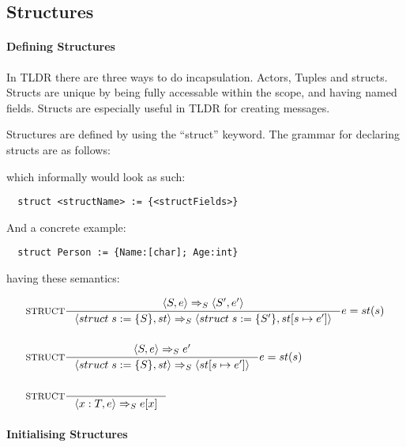 \subsection{Structures}
\label{subsec:structs}

\paragraph{Defining Structures}
\label{sec:defStructures}

In TLDR there are three ways to do incapsulation. Actors, Tuples and structs. Structs are unique by being fully accessable within the scope, and having named fields. Structs are especially useful in TLDR for creating messages.

Structures are defined by using the \enquote{struct} keyword. The grammar for declaring structs are as follows:


which informally would look as such:

\begin{verbatim}
  struct <structName> := {<structFields>}
\end{verbatim}

And a concrete example:

\begin{verbatim}
  struct Person := {Name:[char]; Age:int}
\end{verbatim}

having these semantics:

\begin{align*}
&\inference[$\text{STRUCT}$]{\Braket{S, e} \Rightarrow_S \Braket{S', e'}}
                            {\Braket{struct\;s := \{S\}, st} \Rightarrow_S \Braket{struct\;s := \{S'\}, st[s \mapsto e']}}
                            {e=st(s)}
\\\\
&\inference[$\text{STRUCT}$]{\Braket{S, e} \Rightarrow_S e'}
                            {\Braket{struct\;s := \{S\}, st} \Rightarrow_S \Braket{st[s \mapsto e']}}
                            {e=st(s)}
\\\\
&\inference[$\text{STRUCT}$]{}
                            {\Braket{x:T, e} \Rightarrow_S e[x]}
\end{align*}

\paragraph{Initialising Structures}
\label{sec:initStructures}

